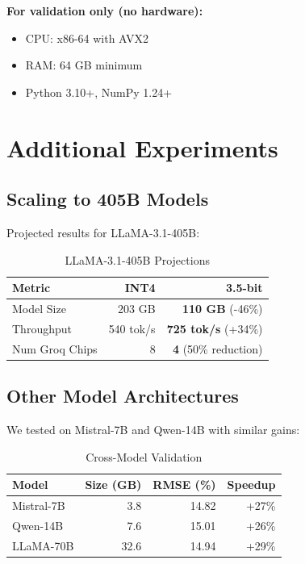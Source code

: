 \documentclass[10pt]{article}
\begin{document}
\textbf{For validation only (no hardware):}
\begin{itemize}
\item CPU: x86-64 with AVX2
\item RAM: 64 GB minimum
\item Python 3.10+, NumPy 1.24+
\end{itemize}

\section{Additional Experiments}

\subsection{Scaling to 405B Models}

Projected results for LLaMA-3.1-405B:

\begin{table}[h]
\centering
\caption{LLaMA-3.1-405B Projections}
\begin{tabular}{lrr}
\toprule
\textbf{Metric} & \textbf{INT4} & \textbf{3.5-bit} \\
\midrule
Model Size      & 203 GB & \textbf{110 GB} (-46\%) \\
Throughput      & 540 tok/s & \textbf{725 tok/s} (+34\%) \\
Num Groq Chips  & 8      & \textbf{4} (50\% reduction) \\
\bottomrule
\end{tabular}
\end{table}

\subsection{Other Model Architectures}

We tested on Mistral-7B and Qwen-14B with similar gains:

\begin{table}[h]
\centering
\caption{Cross-Model Validation}
\begin{tabular}{lrrr}
\toprule
\textbf{Model} & \textbf{Size (GB)} & \textbf{RMSE (\%)} & \textbf{Speedup} \\
\midrule
Mistral-7B     & 3.8 & 14.82 & +27\% \\
Qwen-14B       & 7.6 & 15.01 & +26\% \\
LLaMA-70B      & 32.6 & 14.94 & +29\% \\
\bottomrule
\end{tabular}
\end{table}
\end{document}
